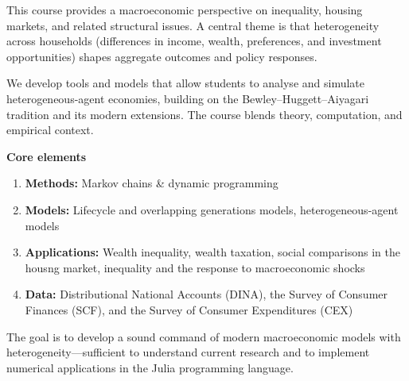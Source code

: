 \documentclass[a4paper, 11pt]{article}
\begin{document}

\medskip {}

\medskip {}

\medskip \noindent
This course provides a macroeconomic perspective on inequality, housing markets, and related structural issues. %
A central theme is that heterogeneity across households (differences in income, wealth, preferences, and investment opportunities) shapes aggregate outcomes and policy responses.

We develop tools and models that allow students to analyse and simulate heterogeneous-agent economies, building on the Bewley–Huggett–Aiyagari tradition and its modern extensions. The course blends theory, computation, and empirical context.

\medskip
\noindent\textbf{Core elements}
\begin{enumerate}
  \item \textbf{Methods:} Markov chains \& dynamic programming
  \item \textbf{Models:} Lifecycle and overlapping generations models, heterogeneous-agent models
  \item \textbf{Applications:} Wealth inequality, wealth taxation, social comparisons in the housng market, inequality and the response to macroeconomic shocks
  \item \textbf{Data:} Distributional National Accounts (DINA), the Survey of Consumer Finances (SCF), and the Survey of Consumer Expenditures (CEX)
\end{enumerate}

\medskip
The goal is to develop a sound command of modern macroeconomic models with heterogeneity—sufficient to understand current research and to implement numerical applications in the Julia programming language.
\end{document}
